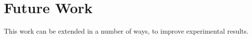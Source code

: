 \chapter{Future Work}
This work can be extended in a number of ways, to improve experimental results.
